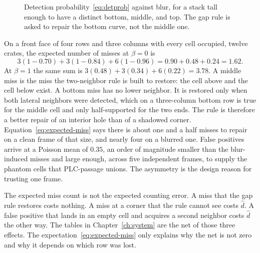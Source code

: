 \begin{figure}[t]
\centering
{}
\caption{Detection probability~\eqref{eq:detprob} against blur, for a stack tall enough to have a distinct bottom, middle, and top. The gap rule is asked to repair the bottom curve, not the middle one.}
\label{fig:detprob}
\end{figure}

On a front face of four rows and three columns with every cell occupied, twelve crates, the expected number of misses at $\beta=0$ is
\begin{equation}
3(1-0.70)+3(1-0.84)+6(1-0.96)
= 0.90+0.48+0.24
= 1.62.
\label{eq:expected-miss}
\end{equation}
At $\beta=1$ the same sum is $3(0.48)+3(0.34)+6(0.22)=3.78$. A middle miss is the miss the two-neighbor rule is built to restore: the cell above and the cell below exist. A bottom miss has no lower neighbor. It is restored only when both lateral neighbors were detected, which on a three-column bottom row is true for the middle cell and only half-supported for the two ends. The rule is therefore a better repair of an interior hole than of a shadowed corner. Equation~\eqref{eq:expected-miss} says there is about one and a half misses to repair on a clean frame of that size, and nearly four on a blurred one. False positives arrive at a Poisson mean of $0.35$, an order of magnitude smaller than the blur-induced misses and large enough, across five independent frames, to supply the phantom cells that PLC-passage unions. The asymmetry is the design reason for trusting one frame.

The expected miss count is not the expected counting error. A miss that the gap rule restores costs nothing. A miss at a corner that the rule cannot see costs $\hat{d}$. A false positive that lands in an empty cell and acquires a second neighbor costs $\hat{d}$ the other way. The tables in Chapter~\ref{ch:system} are the net of those three effects. The expectation~\eqref{eq:expected-miss} only explains why the net is not zero and why it depends on which row was lost.


